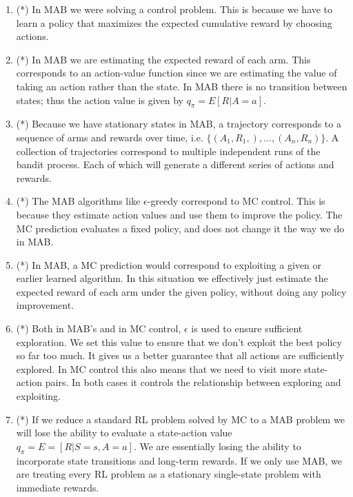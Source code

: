 \documentclass{article}
\begin{document}
\begin{enumerate}
    \item (*) In MAB we were solving a control problem. This is because we have to learn a policy that maximizes the expected cumulative reward by choosing actions. 
    
    \item (*) In MAB we are estimating the expected reward of each arm. This corresponds to an action-value function since we are estimating the value of taking an action rather than the state. In MAB there is no transition between states; thus the action value is given by $q_\pi = E[R | A = a]$.

    \item (*) Because we have stationary states in MAB, a trajectory corresponds to a sequence of arms and rewards over time, i.e. $\{(A_1, R_1,), ..., (A_n, R_n)\}$. A collection of trajectories correspond to multiple independent runs of the bandit process. Each of which will generate a different series of actions and rewards. 

    \item (*) The MAB algorithms like $\epsilon$-greedy correspond to MC control. This is because they estimate action values and use them to improve the policy. The MC prediction evaluates a fixed policy, and does not change it the way we do in MAB. 
    
    \item (*) In MAB, a MC prediction would correspond to exploiting a given or earlier learned algorithm. In this situation we effectively just estimate the expected reward of each arm under the given policy, without doing any policy improvement. 

    \item (*) Both in MAB's and in MC control, $\epsilon$ is used to ensure sufficient exploration. We set this value to ensure that we don't exploit the best policy so far too much. It gives us a better guarantee that all actions are sufficiently explored. In MC control this also means that we need to visit more state-action pairs. In both cases it controls the relationship between exploring and exploiting. 
    
    \item (*) If we reduce a standard RL problem solved by MC to a MAB problem we will lose the ability to evaluate a state-action value $q_\pi = E = [R | S = s,  A = a]$. We are essentially losing the ability to incorporate state transitions and long-term rewards. If we only use MAB, we are treating every RL problem as a stationary single-state problem with immediate rewards. 
\end{enumerate}
\end{document}
